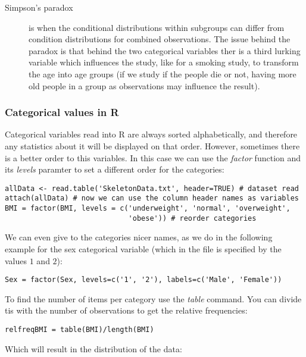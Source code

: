 \begin{description}
  \item[Simpson's paradox] is when the conditional distributions within
  subgroups can differ from condition distributions for combined observations.
  The issue behind the paradox is that behind the two categorical variables ther
  is a third lurking variable which influences the study, like for a smoking
  study, to transform the age into age groups (if we study if the people die
  or not, having more old people in a group as observations may influence the
  result).
\end{description}
\subsubsection{Categorical values in R}

Categorical variables read into R are always sorted alphabetically, and
therefore any statistics about it will be displayed on that order. However,
sometimes there is a better order to this variables. In this case we can use the
\emph{factor} function and its \emph{levels} paramter to set a different order
for the categories: 

\begin{verbatim}
allData <- read.table('SkeletonData.txt', header=TRUE) # dataset read 
attach(allData) # now we can use the column header names as variables
BMI = factor(BMI, levels = c('underweight', 'normal', 'overweight', 
                             'obese')) # reorder categories
\end{verbatim}

We can even give to the categories nicer names, as we do in the following
example for the sex categorical variable (which in the file is specified by the
values $1$ and $2$): 

\begin{verbatim}
Sex = factor(Sex, levels=c('1', '2'), labels=c('Male', 'Female'))
\end{verbatim}

To find the number of items per category use the \emph{table} command. You can
divide tis with the number of observations to get the relative frequencies:

\begin{verbatim}
relfreqBMI = table(BMI)/length(BMI)
\end{verbatim}

Which will result in the distribution of the data:

